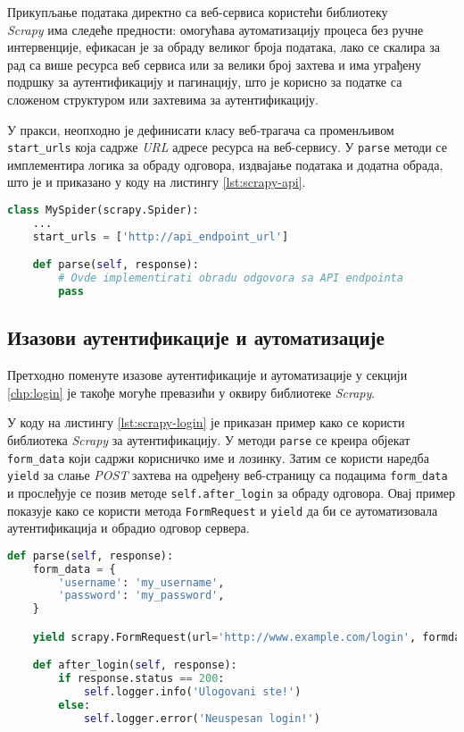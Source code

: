 \documentclass[12pt,oneside]{memoir}
\begin{document}
Прикупљање података директно са веб-сервиса користећи библиотеку\\ \textit{Scrapy} има следеће предности: омогућава аутоматизацију процеса без ручне интервенције, ефикасан је за обраду великог броја података, лако се скалира за рад са више ресурса веб сервиса или за велики број захтева и има уграђену подршку за аутентификацију и пагинацију, што је корисно за податке са сложеном структуром или захтевима за аутентификацију.

У пракси, неопходно је дефинисати класу веб-трагача са променљивом\\ \texttt{start\_urls} која садрже \textit{URL} адресе ресурса на веб-сервису. У \texttt{parse} методи се имплементира логика за обраду одговора, издвајање података и додатна обрада, што је и приказано у коду на листингу \ref{lst:scrapy-api}.

\begin{lstlisting}[language=Python, caption={Прикупљање података директно са \textit{API}}, label={lst:scrapy-api}]
class MySpider(scrapy.Spider):
    ...
    start_urls = ['http://api_endpoint_url']

    def parse(self, response):
        # Ovde implementirati obradu odgovora sa API endpointa
        pass
\end{lstlisting}

\subsection{Изазови аутентификације и аутоматизације}
Претходно поменуте изазове аутентификације и аутоматизације у секцији \ref{chp:login} је такође могуће превазићи у оквиру библиотеке \textit{Scrapy}.

У коду на листингу \ref{lst:scrapy-login} је приказан пример како се користи библиотека \textit{Scrapy} за аутентификацију. У методи \texttt{parse} се креира објекат \texttt{form\_data} који садржи корисничко име и лозинку. Затим се користи наредба \texttt{yield} за слање \textit{POST} захтева на одређену веб-страницу са подацима \texttt{form\_data} и прослеђује се позив методе \texttt{self.after\_login} за обраду одговора. Овај пример показује како се користи метода \texttt{FormRequest} и \texttt{yield} да би се аутоматизовала аутентификација и обрадио одговор сервера.
\begin{lstlisting}[language=Python, caption={Аутентификација у библиотеци \textit{Scrapy}}, label={lst:scrapy-login}]
def parse(self, response):
    form_data = {
        'username': 'my_username',
        'password': 'my_password',
    }

    yield scrapy.FormRequest(url='http://www.example.com/login', formdata=form_data, callback=self.after_login)

    def after_login(self, response):
        if response.status == 200:
            self.logger.info('Ulogovani ste!')
        else:
            self.logger.error('Neuspesan login!')
\end{lstlisting}
\end{document}
